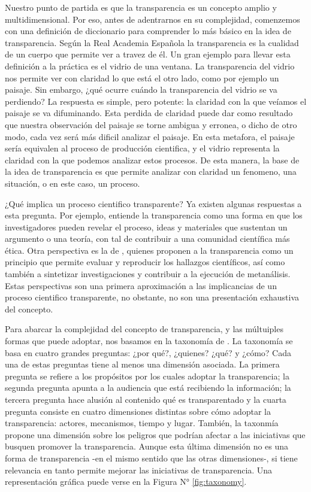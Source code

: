\documentclass[
]{book}
\begin{document}
Nuestro punto de partida es que la transparencia es un concepto amplio y multidimensional. Por eso, antes de adentrarnos en su complejidad, comenzemos con una definición de diccionario para comprender lo más básico en la idea de transparencia. Según la Real Academia Española la transparencia es la cualidad de un cuerpo que permite ver a travez de él. Un gran ejemplo para llevar esta definición a la práctica es el vidrio de una ventana. La transparencia del vidrio nos permite ver con claridad lo que está el otro lado, como por ejemplo un paisaje. Sin embargo, ¿qué ocurre cuándo la transparencia del vidrio se va perdiendo? La respuesta es simple, pero potente: la claridad con la que veíamos el paisaje se va difuminando. Esta perdida de claridad puede dar como resultado que nuestra observación del paisaje se torne ambigua y erronea, o dicho de otro modo, cada vez será más dificil analizar el paisaje. En esta metafora, el paisaje sería equivalen al proceso de producción cientifica, y el vidrio representa la claridad con la que podemos analizar estos procesos. De esta manera, la base de la idea de transparencia es que permite analizar con claridad un fenomeno, una situación, o en este caso, un proceso.

¿Qué implica un proceso cientifico transparente? Ya existen algunas respuestas a esta pregunta. Por ejemplo, \citet{breznau_Does_2021} entiende la transparencia como una forma en que los investigadores pueden revelar el proceso, ideas y materiales que sustentan un argumento o una teoría, con tal de contribuir a una comunidad científica más ética. Otra perspectiva es la de \citet{aczel_consensusbased_2020}, quienes proponen a la transparencia como un principio que permite evaluar y reproducir los hallazgos científicos, así como también a sintetizar investigaciones y contribuir a la ejecución de metanálisis. Estas perspectivas son una primera aproximación a las implicancias de un proceso cientifico transparente, no obstante, no son una presentación exhaustiva del concepto.

Para abarcar la complejidad del concepto de transparencia, y las múltuiples formas que puede adoptar, nos basamos en la taxonomía de \citet{elliott_Taxonomy_2020}. La taxonomía se basa en cuatro grandes preguntas: ¿por qué?, ¿quienes? ¿qué? y ¿cómo? Cada una de estas preguntas tiene al menos una dimensión asociada. La primera pregunta se refiere a los propósitos por los cuales adoptar la transparencia; la segunda pregunta apunta a la audiencia que está recibiendo la información; la tercera pregunta hace alusión al contenido qué es transparentado y la cuarta pregunta consiste en cuatro dimensiones distintas sobre cómo adoptar la transparencia: actores, mecanismos, tiempo y lugar. También, la taxonmía propone una dimensión sobre los peligros que podrían afectar a las iniciativas que busquen promover la transparencia. Aunque esta última dimensión no es una forma de transparencia -en el mismo sentido que las otras dimensiones-, si tiene relevancia en tanto permite mejorar las iniciativas de transparencia. Una representación gráfica puede verse en la Figura N° \ref{fig:taxonomy}.
\end{document}
